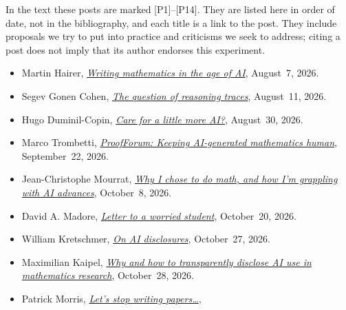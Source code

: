 In the text these posts are marked [P1]--[P14]. They are listed here in order of
date, not in the bibliography, and each title is a link to the post. They
include proposals we try to put into practice and criticisms we seek to address;
citing a post does not imply that its author endorses this experiment.
\begin{itemize}
  \item[\hypertarget{pp:P1}{[P1]}] Martin Hairer,
    \href{https://proofsandprompts.com/2026/08/07/writing-mathematics-in-the-age-of-ai/}{\emph{Writing mathematics in the age of AI}},
    August~7, 2026.
  \item[\hypertarget{pp:P2}{[P2]}] Segev Gonen Cohen,
    \href{https://proofsandprompts.com/2026/08/11/the-question-of-reasoning-traces/}{\emph{The question of reasoning traces}},
    August~11, 2026.
  \item[\hypertarget{pp:P3}{[P3]}] Hugo Duminil-Copin,
    \href{https://proofsandprompts.com/2026/08/30/care-for-a-little-more-ai/}{\emph{Care for a little more AI?}},
    August~30, 2026.
  \item[\hypertarget{pp:P4}{[P4]}] Marco Trombetti,
    \href{https://proofsandprompts.com/2026/09/22/proofforum-keeping-ai-generated-mathematics-human/}{\emph{ProofForum: Keeping AI-generated mathematics human}},
    September~22, 2026.
  \item[\hypertarget{pp:P5}{[P5]}] Jean-Christophe Mourrat,
    \href{https://proofsandprompts.com/2026/10/08/why-i-chose-to-do-math-and-how-im-grappling-with-ai-advances/}{\emph{Why I chose to do math, and how I'm grappling with AI advances}},
    October~8, 2026.
  \item[\hypertarget{pp:P6}{[P6]}] David A. Madore,
    \href{https://proofsandprompts.com/2026/10/20/letter-to-a-worried-student/}{\emph{Letter to a worried student}},
    October~20, 2026.
  \item[\hypertarget{pp:P7}{[P7]}] William Kretschmer,
    \href{https://proofsandprompts.com/2026/10/27/on-ai-disclosures/}{\emph{On AI disclosures}},
    October~27, 2026.
  \item[\hypertarget{pp:P8}{[P8]}] Maximilian Kaipel,
    \href{https://proofsandprompts.com/2026/10/28/why-and-how-to-transparently-disclose-ai-use-in-mathematics-research/}{\emph{Why and how to transparently disclose AI use in mathematics research}},
    October~28, 2026.
  \item[\hypertarget{pp:P9}{[P9]}] Patrick Morris,
    \href{https://proofsandprompts.com/2026/10/30/lets-stop-writing-papers/}{\emph{Let's stop writing papers\ldots}},

\end{itemize}
